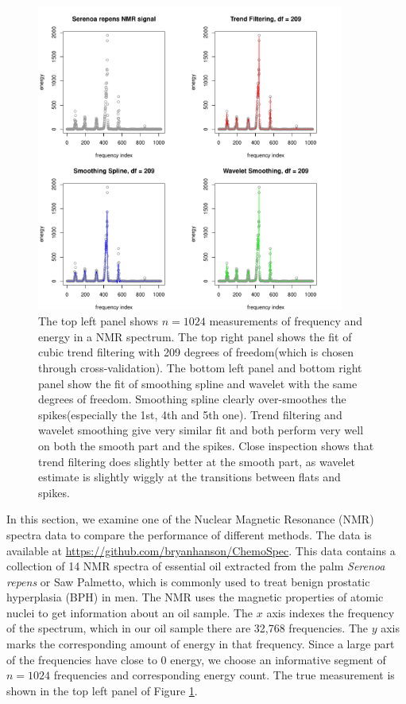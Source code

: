 \documentclass[a4paper]{article}
\begin{document}
\begin{figure}[t!]
\centering
\includegraphics[width = 0.9\textwidth]{Figures/Figure9.pdf}
\caption{The top left panel shows $n=1024$ measurements of frequency and energy in a NMR spectrum. The top right panel shows the fit of cubic trend filtering with 209 degrees of freedom(which is chosen through cross-validation). The bottom left panel and bottom right panel show the fit of smoothing spline and wavelet with the same degrees of freedom. Smoothing spline clearly over-smoothes the spikes(especially the 1st, 4th and 5th one). Trend filtering and wavelet smoothing give very similar fit and both perform very well on both the smooth part and the spikes. Close inspection shows that trend filtering does slightly better at the smooth part, as wavelet estimate is slightly wiggly at the transitions between flats and spikes.}
\label{fig:Figure_9}
\end{figure}


In this section, we examine one of the Nuclear Magnetic Resonance (NMR) spectra data to compare the performance of different methods. The data is available at \url{https://github.com/bryanhanson/ChemoSpec}. This data contains a collection of 14 NMR spectra of essential oil extracted from the
palm \emph{Serenoa repens} or Saw Palmetto, which is commonly used to treat
benign prostatic hyperplasia (BPH) in men. The NMR uses the magnetic properties of atomic nuclei to get information about an oil sample. The $x$ axis indexes the frequency of the spectrum, which in our oil sample there are 32,768 frequencies. The $y$ axis marks the corresponding amount of energy in that frequency. Since a large part of the frequencies have close to 0 energy, we choose an informative segment of $n = 1024$ frequencies and corresponding energy count. The true measurement is shown in the top left panel of Figure \ref{fig:Figure_9}.
\end{document}
